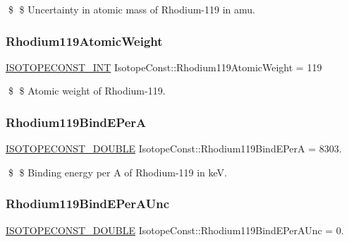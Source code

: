 \$ \$ Uncertainty in atomic mass of Rhodium-\/119 in amu. \mbox{\label{group___isotope_const-_rhodium-_rh119_ga122fd01f0d2ce17416e7e37d9b438476}} 
\subsubsection{\texorpdfstring{Rhodium119\+Atomic\+Weight}{Rhodium119AtomicWeight}}
{\footnotesize\ttfamily \mbox{\hyperlink{group___isotope_const-_macros_ga5f18360b3e99483a35c32d789e62621c}{I\+S\+O\+T\+O\+P\+E\+C\+O\+N\+S\+T\+\_\+\+I\+NT}} Isotope\+Const\+::\+Rhodium119\+Atomic\+Weight = 119}

\$ \$ Atomic weight of Rhodium-\/119. \mbox{\label{group___isotope_const-_rhodium-_rh119_ga21b0aec7de7b2fe551fba627ab9eaa25}} 
\subsubsection{\texorpdfstring{Rhodium119\+Bind\+E\+PerA}{Rhodium119BindEPerA}}
{\footnotesize\ttfamily \mbox{\hyperlink{group___isotope_const-_macros_ga8f45a7272ce02c0b4c65c44636ed719a}{I\+S\+O\+T\+O\+P\+E\+C\+O\+N\+S\+T\+\_\+\+D\+O\+U\+B\+LE}} Isotope\+Const\+::\+Rhodium119\+Bind\+E\+PerA = 8303.}

\$ \$ Binding energy per A of Rhodium-\/119 in keV. \mbox{\label{group___isotope_const-_rhodium-_rh119_ga0a9c26a679d60add963a88db9187ab85}} 
\subsubsection{\texorpdfstring{Rhodium119\+Bind\+E\+Per\+A\+Unc}{Rhodium119BindEPerAUnc}}
{\footnotesize\ttfamily \mbox{\hyperlink{group___isotope_const-_macros_ga8f45a7272ce02c0b4c65c44636ed719a}{I\+S\+O\+T\+O\+P\+E\+C\+O\+N\+S\+T\+\_\+\+D\+O\+U\+B\+LE}} Isotope\+Const\+::\+Rhodium119\+Bind\+E\+Per\+A\+Unc = 0.}

